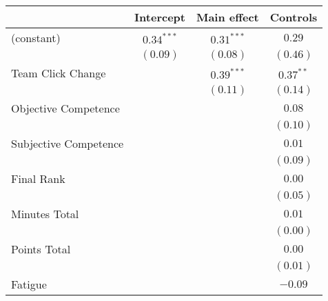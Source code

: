 
\begin{table}
\begin{center}
\begin{tabular}{l c c c }
\toprule
 & Intercept & Main effect & Controls \\
\midrule
(constant)                                     & $\mathbf{0.34}^{***}$ & $\mathbf{0.31}^{***}$ & $0.29$               \\
                                               & $(0.09)$              & $(0.08)$              & $(0.46)$             \\
Team Click Change                              &                       & $\mathbf{0.39}^{***}$ & $\mathbf{0.37}^{**}$ \\
                                               &                       & $(0.11)$              & $(0.14)$             \\
Objective Competence                           &                       &                       & $0.08$               \\
                                               &                       &                       & $(0.10)$             \\
Subjective Competence                          &                       &                       & $0.01$               \\
                                               &                       &                       & $(0.09)$             \\
Final Rank                                     &                       &                       & $0.00$               \\
                                               &                       &                       & $(0.05)$             \\
Minutes Total                                  &                       &                       & $0.01$               \\
                                               &                       &                       & $(0.00)$             \\
Points Total                                   &                       &                       & $0.00$               \\
                                               &                       &                       & $(0.01)$             \\
Fatigue                                        &                       &                       & $-0.09$              \\

\end{tabular}
\end{center}
\end{table}

